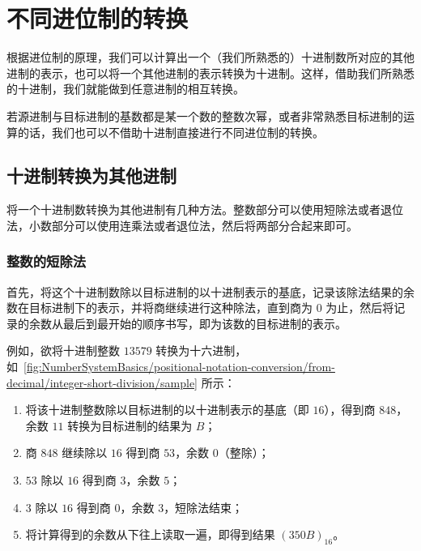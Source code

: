 \section{不同进位制的转换}\label{sec:NumberSystemBasics/positional-notation-conversion}
    根据进位制的原理，我们可以计算出一个（我们所熟悉的）十进制数所对应的其他进制的表示，也可以将一个其他进制的表示转换为十进制。这样，借助我们所熟悉的十进制，我们就能做到任意进制的相互转换。

    若源进制与目标进制的基数都是某一个数的整数次幂，或者非常熟悉目标进制的运算的话，我们也可以不借助十进制直接进行不同进位制的转换。

    \subsection{十进制转换为其他进制}\label{subsec:NumberSystemBasics/positional-notation-conversion/from-decimal}
        将一个十进制数转换为其他进制有几种方法。整数部分可以使用短除法或者退位法，小数部分可以使用连乘法或者退位法，然后将两部分合起来即可。
        \subsubsection{整数的短除法}\label{subsubsec:NumberSystemBasics/positional-notation-conversion/from-decimal/integer-short-division}
            首先，将这个十进制数除以目标进制的以十进制表示的基底，记录该除法结果的余数在目标进制下的表示，并将商继续进行这种除法，直到商为 0 为止，然后将记录的余数从最后到最开始的顺序书写，即为该数的目标进制的表示。

            例如，欲将十进制整数 $13579$ 转换为十六进制，如~\ref{fig:NumberSystemBasics/positional-notation-conversion/from-decimal/integer-short-division/sample} 所示：

            \begin{enumerate}
                \item 将该十进制整数除以目标进制的以十进制表示的基底（即 $16$），得到商 $848$，余数 $11$ 转换为目标进制的结果为 $B$；
                \item 商 $848$ 继续除以 $16$ 得到商 $53$，余数 $0$（整除）；
                \item $53$ 除以 $16$ 得到商 $3$，余数 $5$；
                \item $3$ 除以 $16$ 得到商 $0$，余数 $3$，短除法结束；
                \item 将计算得到的余数从下往上读取一遍，即得到结果 $(350B)_{16}$。
            \end{enumerate}

